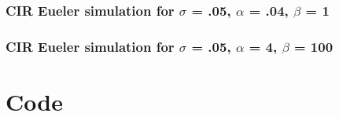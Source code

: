 \documentclass[a4paper,12pt]{article}
\begin{document}
\subsubsection{CIR Eueler simulation for $\sigma$ = .05, $\alpha$ = .04, $\beta$ = 1}

\subsubsection{CIR Eueler simulation for $\sigma$ = .05, $\alpha$ = 4, $\beta$ = 100}


\section*{Code}
\end{document}
